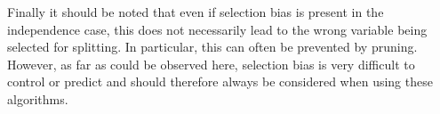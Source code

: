 Finally it should be noted that even if selection bias is present in the independence case, this does not necessarily lead to the wrong variable being selected for splitting. In particular, this can often be prevented by pruning. However, as far as could be observed here, selection bias is very difficult to control or predict and should therefore always be considered when using these algorithms.










